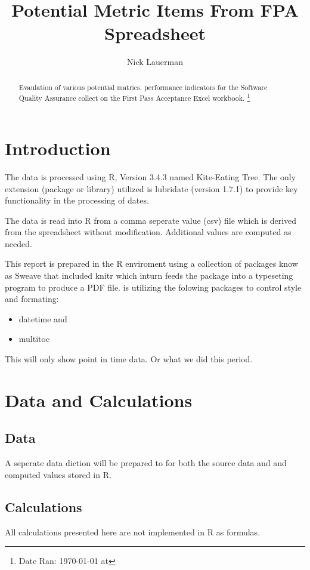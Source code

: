 \documentclass{article}
\title{Potential Metric Items From FPA Spreadsheet}
\author{Nick Lauerman}
\date{}
\begin{document}

\maketitle

\begin{abstract}
Evaulation of various potential matrics, performance indicators for the Software
Quality Assurance collect on the First Pass Acceptance Excel workbook.
\footnote{Date Ran: \today{} at \currenttime}
\end{abstract}

\tableofcontents

\section{Introduction}
The data is processed using R, Version 3.4.3 named Kite-Eating Tree. The only
extension (package or library) utilized is lubridate (version 1.7.1) to provide
key functionality in the processing of dates.

The data is read into R from a comma seperate value (csv) file which is derived
from the spreadsheet without modification. Additional values are computed as needed.

This report is prepared in the R enviroment using a collection of packages know as
Sweave that included knitr which inturn feeds the package into \LaTeXe{} a typeseting
program to produce a PDF file. \LaTeXe{} is utilizing the folowing packages to control
style and formating:
\begin{itemize}
\item datetime and
\item multitoc
\end{itemize}

This will only show point in time data. Or what we did this period.

\section{Data and Calculations}
\subsection{Data}
A seperate data diction will be prepared to for both the source data
and and computed values stored in R.

\subsection{Calculations}
All calculations presented here are not implemented in R as formulas.
\end{document}
